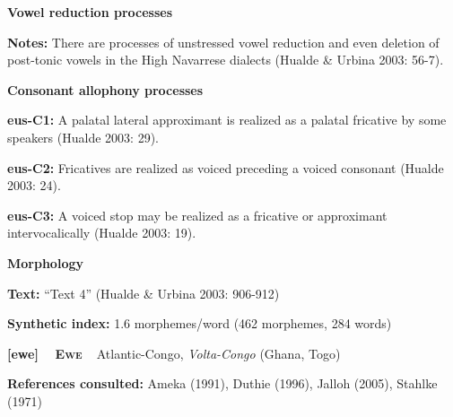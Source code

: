 \begin{styleBody}
\textbf{Vowel reduction processes}
\end{styleBody}

\begin{styleBody}
\textbf{Notes: }There are processes of unstressed vowel reduction and even deletion of post-tonic vowels in the High Navarrese dialects (Hualde \& Urbina 2003: 56-7).
\end{styleBody}

\begin{styleBody}
\textbf{Consonant allophony processes}
\end{styleBody}

\begin{styleBody}
\textbf{eus-C1: }A palatal lateral approximant is realized as a palatal fricative by some speakers (Hualde 2003: 29).
\end{styleBody}

\begin{styleBody}
\textbf{eus-C2: }Fricatives are realized as voiced preceding a voiced consonant (Hualde 2003: 24).
\end{styleBody}

\begin{styleBody}
\textbf{eus-C3: }A voiced stop may be realized as a fricative or approximant intervocalically (Hualde 2003: 19).
\end{styleBody}

\begin{styleBody}
\textbf{Morphology}
\end{styleBody}

\begin{styleBody}
\textbf{Text:} “Text 4” (Hualde \& Urbina 2003: 906-912)
\end{styleBody}

\begin{styleBody}
\textbf{Synthetic index: }1.6 morphemes/word (462 morphemes, 284 words)
\end{styleBody}

\clearpage\begin{styleBody}
\textbf{[ewe] }\ \ \textbf{\textsc{Ewe}}\textbf{\ \ }Atlantic-Congo, \textit{Volta-Congo} (Ghana, Togo)
\end{styleBody}

\begin{styleBody}
\textbf{References consulted: }Ameka (1991), Duthie (1996), Jalloh (2005), Stahlke (1971)
\end{styleBody}

